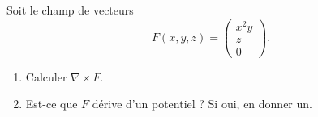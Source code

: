 
\begin{exercice}\label{exoreserve0009}

    Soit le champ de vecteurs 
    \begin{equation}
        F(x,y,z)=\begin{pmatrix}
            x^2y    \\ 
            z    \\ 
            0    
        \end{pmatrix}.
    \end{equation}
    \begin{enumerate}
        \item
            Calculer \( \nabla\times F\).
        \item
            Est-ce que \( F\) dérive d'un potentiel ? Si oui, en donner un.

    \end{enumerate}

\end{exercice}
